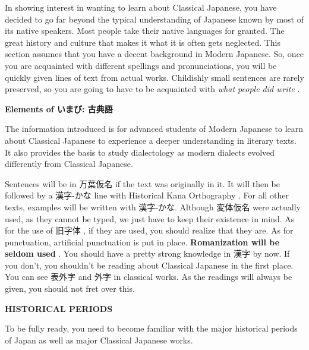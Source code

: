 \par{In showing interest in wanting to learn about Classical Japanese, you have decided to go far beyond the typical understanding of Japanese known by most of its native speakers. Most people take their native languages for granted. The great history and culture that makes it what it is often gets neglected. This section assumes that you have a decent background in Modern Japanese. So, once you are acquainted with different spellings and pronunciations, you will be quickly given lines of text from actual works. Childishly small sentences are rarely preserved, so you are going to have to be acquainted with \emph{what people did write }. }

\par{\textbf{Elements of いまび: 古典語 } }

\par{ The information introduced is for advanced students of Modern Japanese to learn about Classical Japanese to experience a deeper understanding in literary texts. It also provides the basis to study dialectology as modern dialects evolved differently from Classical Japanese. }

\par{ Sentences will be in 万葉仮名 if the text was originally in it. It will then be followed by a 漢字-かな line with Historical Kana Orthography . For all other texts, examples will be written with 漢字-かな. Although 変体仮名 were actually used, as they cannot be typed, we just have to keep their existence in mind. As for the use of 旧字体 , if they are used, you should realize that they are. As for punctuation, artificial punctuation is put in place. \textbf{Romanization will be seldom used }. You should have a pretty strong knowledge in 漢字 by now. If you don't, you shouldn't be reading about Classical Japanese in the first place. You can see 表外字 and 外字 in classical works. As the readings will always be given, you should not fret over this. }

\par{\textbf{HISTORICAL PERIODS }}

\par{To be fully ready, you need to become familiar with the major historical periods of Japan as well as major Classical Japanese works. }

